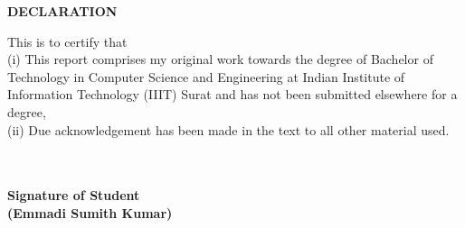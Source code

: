 \thispagestyle{plain}
\normalsize

\begin{center}
{\Large {\bf \uppercase{Declaration}}}
\end{center}

\vspace{\baselineskip}
\justify
\indent
This is to certify that \\
\noindent(i) This report comprises my original work towards the degree of Bachelor of Technology in Computer Science and Engineering at Indian Institute of Information Technology (IIIT) Surat and has not been submitted elsewhere for a degree,  \\
\noindent(ii) Due acknowledgement has been made in the text to all other material used.

\justify

\begin{minipage}{\textwidth}
\begin{flushright} 


{\small \bf \textcolor{white}{}}\\
{\small \bf \textcolor{white}{}}\\
{\small \bf Signature of Student} \\
{\small \bf (Emmadi Sumith Kumar)}\\[0.65cm]
\end{flushright}
\end{minipage}
\newpage